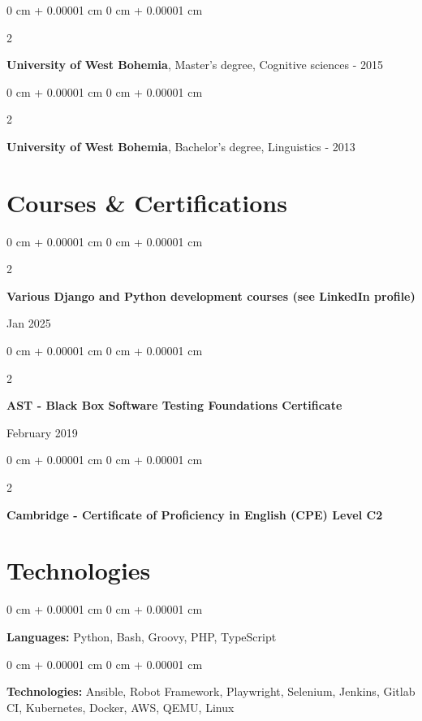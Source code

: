 \documentclass[10pt, letterpaper]{article}
\newenvironment{onecolentry}{
    \begin{adjustwidth}{
        0 cm + 0.00001 cm
    }{
        0 cm + 0.00001 cm
    }
}{
    \end{adjustwidth}
} %
\newenvironment{twocolentry}[2][]{
    \onecolentry
    \def\secondColumn{#2}
    \setcolumnwidth{\fill, 4.5 cm}
    \begin{paracol}{2}
}{
    \switchcolumn \raggedleft \secondColumn
    \end{paracol}
    \endonecolentry
} %
\begin{document}
        \begin{twocolentry}{
            2013 - 2015
        }
            \textbf{University of West Bohemia}, Master's degree, Cognitive sciences\end{twocolentry}

        \vspace{0.10 cm}

        \begin{twocolentry}{
            2009 - 2013
        }
            \textbf{University of West Bohemia}, Bachelor's degree, Linguistics\end{twocolentry}

    \section{Courses \& Certifications}

        \begin{twocolentry}{
            Jan 2025
        }
            \textbf{Various Django and Python development courses (see LinkedIn profile)}
        \end{twocolentry}

        \vspace{0.10 cm}

        \begin{twocolentry}{
            February 2019
        }
            \textbf{AST - Black Box Software Testing Foundations Certificate}
        \end{twocolentry}

        \vspace{0.10 cm}

        \begin{twocolentry}{

        }
            \textbf{Cambridge - Certificate of Proficiency in English (CPE) Level C2}
        \end{twocolentry}

        \vspace{0.2 cm}

    \section{Technologies}


        \begin{onecolentry}
            \textbf{Languages:} Python, Bash, Groovy, PHP, TypeScript
        \end{onecolentry}

        \vspace{0.2 cm}

        \begin{onecolentry}
            \textbf{Technologies:} Ansible, Robot Framework, Playwright, Selenium, Jenkins, Gitlab CI, Kubernetes, Docker, AWS, QEMU, Linux
        \end{onecolentry}
\end{document}
